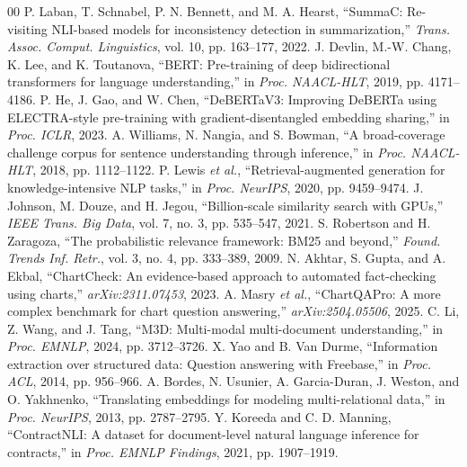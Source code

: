 \documentclass[conference]{IEEEtran}
\begin{document}
\begin{thebibliography}{00}
P. Laban, T. Schnabel, P. N. Bennett, and M. A. Hearst, ``SummaC: Re-visiting NLI-based models for inconsistency detection in summarization,'' \textit{Trans. Assoc. Comput. Linguistics}, vol. 10, pp. 163--177, 2022.
J. Devlin, M.-W. Chang, K. Lee, and K. Toutanova, ``BERT: Pre-training of deep bidirectional transformers for language understanding,'' in \textit{Proc. NAACL-HLT}, 2019, pp. 4171--4186.
P. He, J. Gao, and W. Chen, ``DeBERTaV3: Improving DeBERTa using ELECTRA-style pre-training with gradient-disentangled embedding sharing,'' in \textit{Proc. ICLR}, 2023.
A. Williams, N. Nangia, and S. Bowman, ``A broad-coverage challenge corpus for sentence understanding through inference,'' in \textit{Proc. NAACL-HLT}, 2018, pp. 1112--1122.
P. Lewis \textit{et al.}, ``Retrieval-augmented generation for knowledge-intensive NLP tasks,'' in \textit{Proc. NeurIPS}, 2020, pp. 9459--9474.
J. Johnson, M. Douze, and H. Jegou, ``Billion-scale similarity search with GPUs,'' \textit{IEEE Trans. Big Data}, vol. 7, no. 3, pp. 535--547, 2021.
S. Robertson and H. Zaragoza, ``The probabilistic relevance framework: BM25 and beyond,'' \textit{Found. Trends Inf. Retr.}, vol. 3, no. 4, pp. 333--389, 2009.
N. Akhtar, S. Gupta, and A. Ekbal, ``ChartCheck: An evidence-based approach to automated fact-checking using charts,'' \textit{arXiv:2311.07453}, 2023.
A. Masry \textit{et al.}, ``ChartQAPro: A more complex benchmark for chart question answering,'' \textit{arXiv:2504.05506}, 2025.
C. Li, Z. Wang, and J. Tang, ``M3D: Multi-modal multi-document understanding,'' in \textit{Proc. EMNLP}, 2024, pp. 3712--3726.
X. Yao and B. Van Durme, ``Information extraction over structured data: Question answering with Freebase,'' in \textit{Proc. ACL}, 2014, pp. 956--966.
A. Bordes, N. Usunier, A. Garcia-Duran, J. Weston, and O. Yakhnenko, ``Translating embeddings for modeling multi-relational data,'' in \textit{Proc. NeurIPS}, 2013, pp. 2787--2795.
Y. Koreeda and C. D. Manning, ``ContractNLI: A dataset for document-level natural language inference for contracts,'' in \textit{Proc. EMNLP Findings}, 2021, pp. 1907--1919.
\end{thebibliography}
\end{document}
